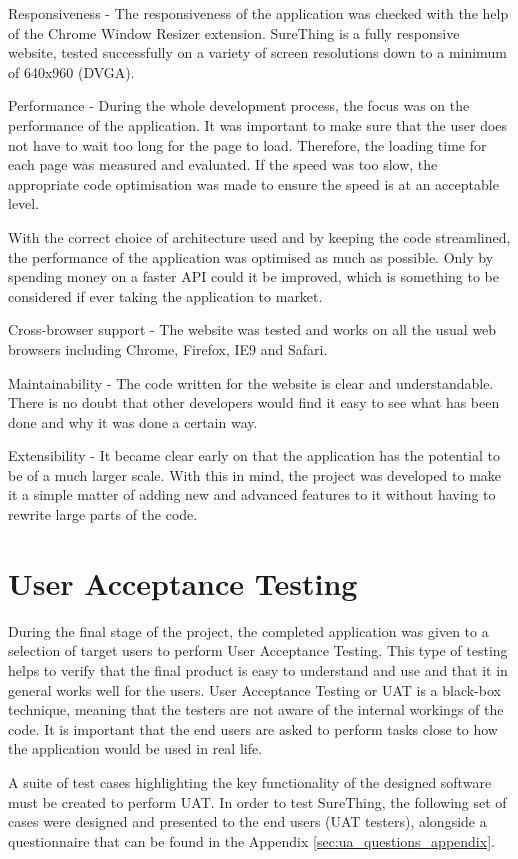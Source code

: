 Responsiveness - The responsiveness of the application was checked with the help of the Chrome Window Resizer extension. SureThing is a fully responsive website, tested successfully on a variety of screen resolutions down to a minimum of 640x960 (DVGA).

Performance - During the whole development process, the focus was on the performance of the application. It was important to make sure that the user does not have to wait too long for the page to load. Therefore, the loading time for each page was measured and evaluated. If the speed was too slow, the appropriate code optimisation was made to ensure the speed is at an acceptable level. 

With the correct choice of architecture used and by keeping the code streamlined, the performance of the application was optimised as much as possible. Only by spending money on a faster API could it be improved, which is something to be considered if ever taking the application to market.

Cross-browser support - The website was tested and works on all the usual web browsers including Chrome, Firefox, IE9 and Safari.

Maintainability - The code written for the website is clear and understandable.  There is no doubt that other developers would find it easy to see what has been done and why it was done a certain way.

Extensibility - It became clear early on that the application has the potential to be of a much larger scale.  With this in mind, the project was developed to make it a simple matter of adding new and advanced features to it without having to rewrite large parts of the code.

\section{User Acceptance Testing}
\label{sec:uat_test}
During the final stage of the project, the completed application was given to a selection of target users to perform User Acceptance Testing. This type of testing helps to verify that the final product is easy to understand and use and that it in general works well for the users. User Acceptance Testing or UAT is a black-box technique, meaning that the testers are not aware of the internal workings of the code. It is important that the end users are asked to perform tasks close to how the application would be used in real life.

A suite of test cases highlighting the key functionality of the designed software must be created to perform UAT. In order to test SureThing, the following set of cases were designed and presented to the end users (UAT testers), alongside a questionnaire that can be found in the Appendix \ref{sec:ua_questions_appendix}.


